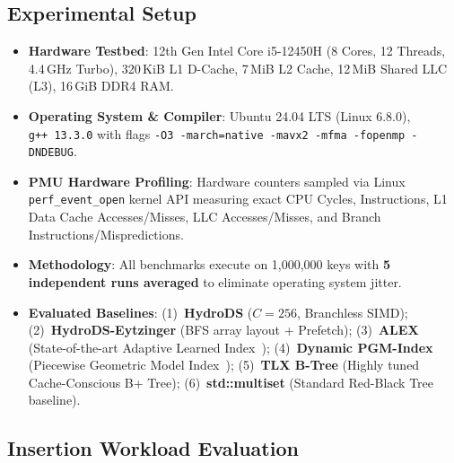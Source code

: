 \documentclass[10pt,twocolumn,letterpaper]{article}
\theoremstyle{definition}
\begin{document}
\subsection{Experimental Setup}
\begin{itemize}
  \item \textbf{Hardware Testbed}: 12th Gen Intel Core i5-12450H (8 Cores, 12 Threads, 4.4\,GHz Turbo), 320\,KiB L1 D-Cache, 7\,MiB L2 Cache, 12\,MiB Shared LLC (L3), 16\,GiB DDR4 RAM.
  \item \textbf{Operating System & Compiler}: Ubuntu 24.04 LTS (Linux 6.8.0), \texttt{g++~13.3.0} with flags \texttt{-O3 -march=native -mavx2 -mfma -fopenmp -DNDEBUG}.
  \item \textbf{PMU Hardware Profiling}: Hardware counters sampled via Linux \texttt{perf\_event\_open} kernel API measuring exact CPU Cycles, Instructions, L1 Data Cache Accesses/Misses, LLC Accesses/Misses, and Branch Instructions/Mispredictions.
  \item \textbf{Methodology}: All benchmarks execute on 1,000,000 keys with \textbf{5 independent runs averaged} to eliminate operating system jitter.
  \item \textbf{Evaluated Baselines}:
    (1)~\textbf{HydroDS} ($C{=}256$, Branchless SIMD);
    (2)~\textbf{HydroDS-Eytzinger} (BFS array layout + Prefetch);
    (3)~\textbf{ALEX} (State-of-the-art Adaptive Learned Index~\cite{ding2020alex});
    (4)~\textbf{Dynamic PGM-Index} (Piecewise Geometric Model Index~\cite{ferragina2020pgm});
    (5)~\textbf{TLX B-Tree} (Highly tuned Cache-Conscious B+ Tree);
    (6)~\textbf{std::multiset} (Standard Red-Black Tree baseline).
\end{itemize}

\subsection{Insertion Workload Evaluation}
\end{document}
